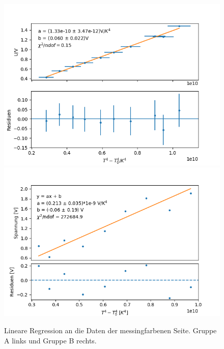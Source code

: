 \documentclass[12pt,a4paper]{article}
\begin{document}
\begin{figure}
\centering
\includegraphics[scale=0.5]{Bilder/Messing_A}
\includegraphics[scale=0.5]{Bilder/messing_B}
\caption{Lineare Regression an die Daten der messingfarbenen Seite. Gruppe A links und Gruppe B rechts.}
\label{fig:RegMessing}
\end{figure}
\end{document}
